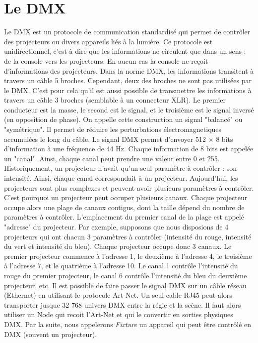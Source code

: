 \section{Le DMX}
\label{sec:dmx}

Le DMX est un protocole de communication standardisé qui permet de contrôler des projecteurs ou divers appareils liés à la lumière.
\newline
Ce protocole est unidirectionnel, c'est-à-dire que les informations ne circulent que dans un sens : de la console vers les projecteurs. En aucun cas la console ne reçoit d'informations des projecteurs.
\newline
\newline
Dans la norme DMX, les informations transitent à travers un câble 5 broches. Cependant, deux des broches ne sont pas utilisées par le DMX. C'est pour cela qu'il est aussi possible de transmettre les informations à travers un câble 3 broches (semblable à un connecteur XLR).
\newline
Le premier conducteur est la masse, le second est le signal, et le troisième est le signal inversé (en opposition de phase). On appelle cette construction un signal "balancé" ou "symétrique". Il permet de réduire les perturbations électromagnetiques accumulées le long du câble.
\newline
\newline
Le signal DMX permet d'envoyer 512 $\times$ 8 bits d'information à une fréquence de 44 Hz.
Chaque information de 8 bits est appelée un "canal". Ainsi, chaque canal peut prendre une valeur entre 0 et 255.
\newline
Historiquement, un projecteur n'avait qu'un seul paramètre à contrôler : son intensité. Ainsi, chaque canal correspondait à un projecteur.
Aujourd'hui, les projecteurs sont plus complexes et peuvent avoir plusieurs paramètres à contrôler. C'est pourquoi un projecteur peut occuper plusieurs canaux.
Chaque projecteur occupe alors une plage de canaux contigus, dont la taille dépend du nombre de paramètres à contrôler. L'emplacement du premier canal de la plage est appelé "adresse" du projecteur.
\newline
Par exemple, supposons que nous disposions de 4 projecteurs qui ont chacun 3 paramètres à contrôler (intensité du rouge, intensité du vert et intensité du bleu). Chaque projecteur occupe donc 3 canaux. Le premier projecteur commence à l'adresse 1, le deuxième à l'adresse 4, le troisième à l'adresse 7, et le quatrième à l'adresse 10.
Le canal 1 contrôle l'intensité du rouge du premier projecteur, le canal 6 contrôle l'intensité du bleu du deuxième projecteur, etc.
\newline
\newline
Il est possible de faire passer le signal DMX sur un câble réseau (Ethernet) en utilisant le protocole Art-Net.
Un seul cable RJ45 peut alors transporter jusque 32 768 univers DMX entre la régie et la scène.
\newline
Il faut alors utiliser un Node qui recoit l'Art-Net et qui le convertir en sorties physiques DMX.
\newline
\newline
Par la suite, nous appelerons \textit{Fixture} un appareil qui peut être contrôlé en DMX (souvent un projecteur).
